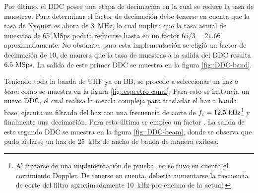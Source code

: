 \documentclass[../../main.tex]{subfiles}
\begin{document}
Por último, el DDC posee una etapa de decimación en la cual se reduce la tasa de muestreo. Para determinar el factor de decimación debe tenerse en cuenta que la tasa de Nyquist \cite{Nyquist-rate} es ahora de 3~MHz, lo cual implica que la tasa actual de muestreo de 65~MSps podría reducirse hasta en un factor $65/3 = 21.66$ aproximadamente. 
No obstante, para esta implementación se eligió un factor de decimación de 10, de manera que la tasa de muestras a la salida del DDC resulta $6.5~\textrm{MSps}$. La salida de este primer DDC se muestra en la figura \ref{fig::DDC-band}.

Teniendo toda la banda de UHF ya en BB, se procede a seleccionar un haz o \textit{beam} como se muestra en la figura \ref{fig::espectro-canal}. 
Para esto se instancia un nuevo DDC, el cual realiza la mezcla compleja para trasladar el haz a banda base, ejecuta un filtrado del haz con una frecuencia de corte de $f_c = 12.5~\textrm{kHz}$\footnote{Al tratarse de una implementación de prueba, no se tuvo en cuenta el corrimiento Doppler. 
De tenerse en cuenta, debería aumentarse la frecuencia de corte del filtro aproximadamente 10~kHz por encima de la actual.} y finalmente una decimación. 
Para esta última se empleo un factor . La salida de este segundo DDC se muestra en la figura \ref{fig::DDC-beam}, donde se observa que pudo aislarse un haz de 25~kHz de ancho de banda de manera exitosa.

\end{document}
